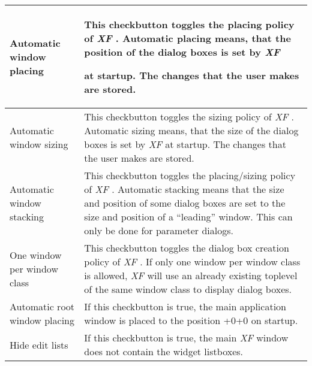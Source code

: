 {\newpage
\clearpage
\samepage \begin{supertabular}{|l|p{5.5cm}|}
Automatic window placing      & This checkbutton toggles the
                                placing policy of {\em XF}
.
                                Automatic placing means,
                                that the position of the
                                dialog boxes is set by {\em XF }

                                at startup. The changes that
                                the user makes are stored.\\  \hline
Automatic window sizing       & This checkbutton toggles the
                                sizing policy of {\em XF}
.
                                Automatic sizing means,
                                that the size of the dialog
                                boxes is set by {\em XF }
 at
                                startup. The changes that
                                the user makes are stored.\\  \hline
Automatic window stacking     & This checkbutton toggles the
                                placing/sizing policy of
                                {\em XF}
. Automatic stacking means
                                that the size and position
                                of some dialog boxes are set
                                to the size and position of
                                a ``leading'' window. This
                                can only be done for
                                parameter dialogs.\\  \hline
One window per window class   & This checkbutton toggles the
                                dialog box creation policy
                                of {\em XF}
. If only one window
                                per window class is allowed,
                                {\em XF }
 will use an already
                                existing toplevel of the
                                same window class to display
                                dialog boxes.\\  \hline
Automatic root window placing & If this checkbutton is true,
                                the main application window
                                is placed to the position
                                +0+0 on startup.\\  \hline
Hide edit lists               & If this checkbutton is true,
                                the main {\em XF }
 window does not
                                contain the widget listboxes.\\  \hline

\end{supertabular}}
